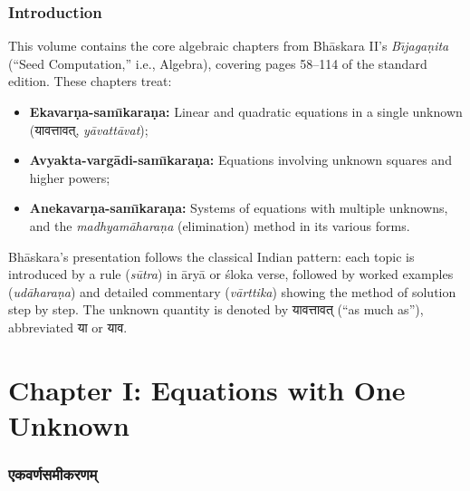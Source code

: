\documentclass[11pt,a4paper]{article}
\newcommand{\dev}[1]{{\devanagarifont #1}}
\begin{document}
\tableofcontents
\newpage

\section*{Introduction}

This volume contains the core algebraic chapters from Bh\={a}skara II's
\textit{B\={\i}jaga\d{n}ita} (``Seed Computation,'' i.e., Algebra), covering
pages 58--114 of the standard edition. These chapters treat:

\begin{itemize}
  \item \textbf{Ekavar\d{n}a-sam\={\i}kara\d{n}a:} Linear and quadratic equations
    in a single unknown (\dev{यावत्तावत्}, \textit{y\={a}vatt\={a}vat});
  \item \textbf{Avyakta-varg\={a}di-sam\={\i}kara\d{n}a:} Equations involving
    unknown squares and higher powers;
  \item \textbf{Anekavar\d{n}a-sam\={\i}kara\d{n}a:} Systems of equations with
    multiple unknowns, and the \textit{madhyam\={a}hara\d{n}a} (elimination)
    method in its various forms.
\end{itemize}

Bh\={a}skara's presentation follows the classical Indian pattern: each topic
is introduced by a rule (\textit{s\={u}tra}) in \={a}ry\={a} or \'{s}loka verse, followed by worked
examples (\textit{ud\={a}hara\d{n}a}) and detailed commentary (\textit{v\={a}rttika})
showing the method of solution step by step. The unknown quantity is denoted
by \dev{यावत्तावत्} (``as much as''), abbreviated \dev{या} or \dev{याव}.
\newpage

\part*{Chapter I: Equations with One Unknown}

\section*{\dev{एकवर्णसमीकरणम्}}
\end{document}
